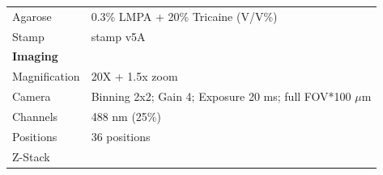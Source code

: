 \documentclass[11pt,singlespacinge,twoside]{reedthesis} %
\begin{document}
\begin{longtable}[]{@{}ll@{}}
\begin{minipage}[t]{0.21\columnwidth}
Agarose\strut
\end{minipage} & \begin{minipage}[t]{0.73\columnwidth}\raggedright
0.3\% LMPA + 20\% Tricaine (V/V\%)\strut
\end{minipage}\tabularnewline
\begin{minipage}[t]{0.21\columnwidth}\raggedright
Stamp\strut
\end{minipage} & \begin{minipage}[t]{0.73\columnwidth}\raggedright
stamp v5A\strut
\end{minipage}\tabularnewline
\begin{minipage}[t]{0.21\columnwidth}\raggedright
\textbf{Imaging}\strut
\end{minipage} & \begin{minipage}[t]{0.73\columnwidth}\raggedright
\strut
\end{minipage}\tabularnewline
\begin{minipage}[t]{0.21\columnwidth}\raggedright
Magnification\strut
\end{minipage} & \begin{minipage}[t]{0.73\columnwidth}\raggedright
20X + 1.5x zoom\strut
\end{minipage}\tabularnewline
\begin{minipage}[t]{0.21\columnwidth}\raggedright
Camera\strut
\end{minipage} & \begin{minipage}[t]{0.73\columnwidth}\raggedright
Binning 2x2; Gain 4; Exposure 20 ms; full FOV*100 \(\mu\)m\strut
\end{minipage}\tabularnewline
\begin{minipage}[t]{0.21\columnwidth}\raggedright
Channels\strut
\end{minipage} & \begin{minipage}[t]{0.73\columnwidth}\raggedright
488 nm (25\%)\strut
\end{minipage}\tabularnewline
\begin{minipage}[t]{0.21\columnwidth}\raggedright
Positions\strut
\end{minipage} & \begin{minipage}[t]{0.73\columnwidth}\raggedright
36 positions\strut
\end{minipage}\tabularnewline
\begin{minipage}[t]{0.21\columnwidth}\raggedright
Z-Stack\strut
\end{minipage} & \begin{minipage}[t]{0.73\columnwidth}\raggedright

\end{minipage}
\end{longtable}
\end{document}
